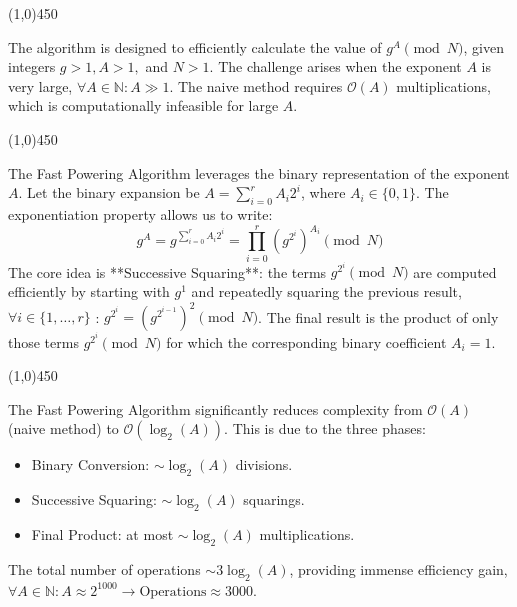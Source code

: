 \begin{center}
    \vspace{10pt}
    \line(1,0){450}
    \vspace{25pt}
\end{center}

\begin{remark}
The algorithm is designed to efficiently calculate the value of $g^A \pmod{N}$, given integers $g > 1, A > 1,$ and $N > 1$. The challenge arises when the exponent $A$ is very large, $\forall A \in \mathbb{N} : A \gg 1$. The naive method requires $\mathcal{O}(A)$ multiplications, which is computationally infeasible for large $A$.
\end{remark}

\begin{center}
    \vspace{10pt}
    \line(1,0){450}
    \vspace{25pt}
\end{center}

\begin{remark}
The Fast Powering Algorithm leverages the binary representation of the exponent $A$. Let the binary expansion be $A = \sum_{i=0}^r A_i 2^i$, where $A_i \in \{0, 1\}$.
The exponentiation property allows us to write:
$$
g^A = g^{\sum_{i=0}^r A_i 2^i} = \prod_{i=0}^r (g^{2^i})^{A_i} \pmod{N}
$$
The core idea is **Successive Squaring**: the terms $g^{2^i} \pmod{N}$ are computed efficiently by starting with $g^1$ and repeatedly squaring the previous result, $\forall i \in \{1, \ldots, r\}$ : $g^{2^i} = (g^{2^{i-1}})^2 \pmod{N}$.
The final result is the product of only those terms $g^{2^i} \pmod{N}$ for which the corresponding binary coefficient $A_i = 1$.
\end{remark}

\begin{center}
    \vspace{10pt}
    \line(1,0){450}
    \vspace{25pt}
\end{center}

\begin{remark}
The Fast Powering Algorithm significantly reduces complexity from $\mathcal{O}(A)$ (naive method) to $\mathcal{O}(\log_2(A))$.
This is due to the three phases:
\begin{itemize}
    \item Binary Conversion: $\sim \log_2(A)$ divisions.
    \item Successive Squaring: $\sim \log_2(A)$ squarings.
    \item Final Product: at most $\sim \log_2(A)$ multiplications.
\end{itemize}
The total number of operations $\sim 3 \log_2(A)$, providing immense efficiency gain, $\forall A \in \mathbb{N} : A \approx 2^{1000} \rightarrow \text{Operations} \approx 3000$.
\end{remark}

